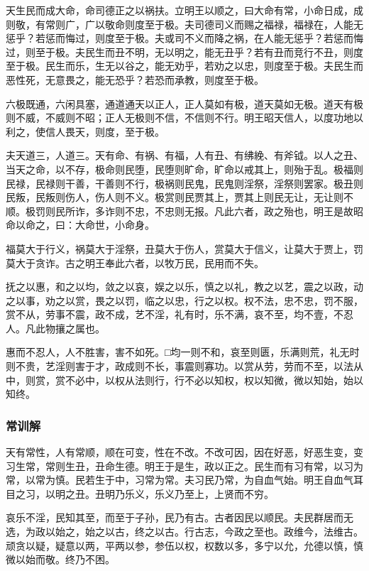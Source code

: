 \documentclass[]{article}
\begin{document}
天生民而成大命，命司德正之以祸扶。立明王以顺之，曰大命有常，小命日成，成则敬，有常则广，广以敬命则度至于极。夫司德司义而赐之福禄，福禄在，人能无惩乎？若惩而悔过，则度至于极。夫或司不义而降之祸，在人能无惩乎？若惩而悔过，则至于极。夫民生而丑不明，无以明之，能无丑乎？若有丑而竞行不丑，则度至于极。民生而乐，生无以谷之，能无劝乎，若劝之以忠，则度至于极。夫民生而恶性死，无意畏之，能无恐乎？若恐而承教，则度至于极。

六极既通，六闲具塞，通道通天以正人，正人莫如有极，道天莫如无极。道天有极则不威，不威则不昭；正人无极则不信，不信则不行。明王昭天信人，以度功地以利之，使信人畏天，则度，至于极。

夫天道三，人道三。天有命、有祸、有福，人有丑、有绋絻、有斧钺。以人之丑、当天之命，以不存，极命则民堕，民堕则旷命，旷命以戒其上，则殆于乱。极福则民禄，民禄则干善，干善则不行，极祸则民鬼，民鬼则淫祭，淫祭则罢家。极丑则民叛，民叛则伤人，伤人则不义。极赏则民贾其上，贾其上则民无让，无让则不顺。极罚则民所诈，多诈则不忠，不忠则无报。凡此六者，政之殆也，明王是故昭命以命之，曰：大命世，小命身。

福莫大于行义，祸莫大于淫祭，丑莫大于伤人，赏莫大于信义，让莫大于贾上，罚莫大于贪诈。古之明王奉此六者，以牧万民，民用而不失。

抚之以惠，和之以均，敛之以哀，娱之以乐，慎之以礼，教之以艺，震之以政，动之以事，劝之以赏，畏之以罚，临之以忠，行之以权。权不法，忠不忠，罚不服，赏不从，劳事不震，政不成，艺不淫，礼有时，乐不满，哀不至，均不壹，不忍人。凡此物攘之属也。

惠而不忍人，人不胜害，害不如死。□均一则不和，哀至则匮，乐满则荒，礼无时则不贵，艺淫则害于才，政成则不长，事震则寡功。以赏从劳，劳而不至，以法从中，则赏，赏不必中，以权从法则行，行不必以知权，权以知微，微以知始，始以知终。

\hypertarget{header-n23}{%
\subsubsection{常训解}\label{header-n23}}

天有常性，人有常顺，顺在可变，性在不改。不改可因，因在好恶，好恶生变，变习生常，常则生丑，丑命生德。明王于是生，政以正之。民生而有习有常，以习为常，以常为慎。民若生于中，习常为常。夫习民乃常，为自血气始。明王自血气耳目之习，以明之丑。丑明乃乐义，乐义乃至上，上贤而不穷。

哀乐不淫，民知其至，而至于子孙，民乃有古。古者因民以顺民。夫民群居而无选，为政以始之，始之以古，终之以古。行古志，今政之至也。政维今，法维古。顽贪以疑，疑意以两，平两以参，参伍以权，权数以多，多宁以允，允德以慎，慎微以始而敬。终乃不困。
\end{document}
